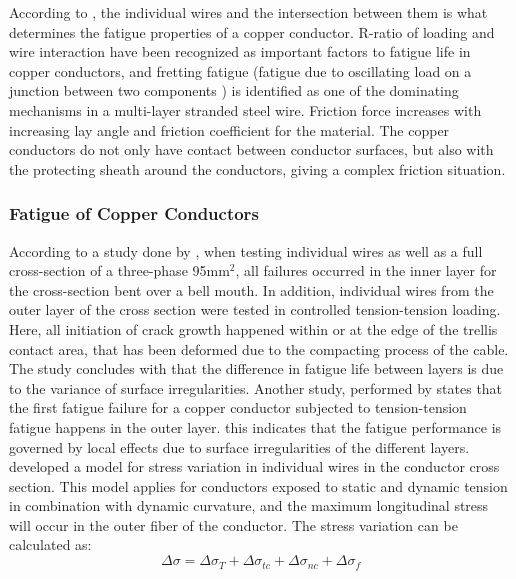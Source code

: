 \noindent According to \cite{Karlsen2010}, the individual wires and the intersection between them is what determines the fatigue properties of a copper conductor. R-ratio of loading and wire interaction have been recognized as important factors to fatigue life in copper conductors, and fretting fatigue (fatigue due to oscillating load on a junction between two components \cite{Hills1994}) is identified as one of the dominating mechanisms in a multi-layer stranded steel wire. Friction force increases with increasing lay angle and friction coefficient for the material. The copper conductors do not only have contact between conductor surfaces, but also with the protecting sheath around the conductors, giving a complex friction situation. 

\subsubsection{Fatigue of Copper Conductors}
According to a study done by \cite{Nasution2013}, when testing individual wires as well as a full cross-section of a three-phase 95mm$^2$, all failures occurred in the inner layer for the cross-section bent over a bell mouth. In addition, individual wires from the outer layer of the cross section were tested in controlled tension-tension loading. Here, all initiation of crack growth happened within or at the edge of the trellis contact area, that has been deformed due to the compacting process of the cable. The study concludes with that the difference in fatigue life between layers is due to the variance of surface irregularities. Another study, performed by \cite{NASUTION2014} states that the first fatigue failure for a copper conductor subjected to tension-tension fatigue happens in the outer layer. this indicates that the fatigue performance is governed by local effects due to surface irregularities of the different layers. \newline
\newline
\noindent \cite{savik2014} developed a model for stress variation in individual wires in the conductor cross section. This model applies for conductors exposed to static and dynamic tension in combination with dynamic curvature, and the maximum longitudinal stress will occur in the outer fiber of the conductor. The stress variation can be calculated as:   
\begin{equation}
    \Delta \sigma = \Delta \sigma_T + \Delta \sigma_{tc} + \Delta \sigma_{nc} + \Delta \sigma_{f}
    \label{eq:stressvariation}
\end{equation}
